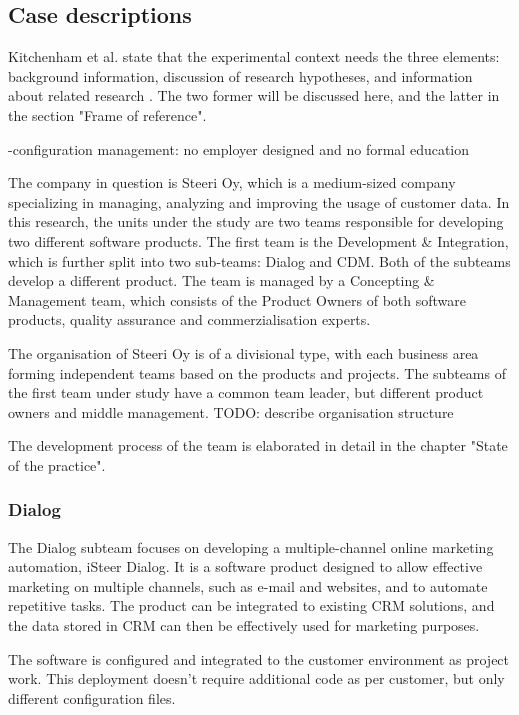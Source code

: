 \documentclass[english]{tktltiki2}
\theoremstyle{definition}
\theoremstyle{remark}
\begin{document}
\subsection{Case descriptions} %
Kitchenham et al. state that the experimental context needs the three elements: background information, discussion of research hypotheses, and information about related research \cite{kitchenham2002preliminary}. The two former will be discussed here, and the latter in the section "Frame of reference".

-configuration management: no employer designed and no formal education

The company in question is Steeri Oy, which is a medium-sized company specializing in managing, analyzing and improving the usage of customer data. In this research, the units under the study are two teams responsible for developing two different software products. The first team is the Development & Integration, which is further split into two sub-teams: Dialog and CDM. Both of the subteams develop a different product. The team is managed by a Concepting & Management team, which consists of the Product Owners of both software products, quality assurance and commerzialisation experts. 

The organisation of Steeri Oy is of a divisional type, with each business area forming independent teams based on the products and projects. The subteams of the first team under study have a common team leader, but different product owners and middle management. TODO: describe organisation structure %

The development process of the team is elaborated in detail in the chapter "State of the practice". 

\subsubsection{Dialog}
The Dialog subteam focuses on developing a multiple-channel online marketing automation, iSteer Dialog. It is a software product designed to allow effective marketing on multiple channels, such as e-mail and websites, and to automate repetitive tasks. The product can be integrated to existing CRM solutions, and the data stored in CRM can then be effectively used for marketing purposes. 

The software is configured and integrated to the customer environment as project work. This deployment doesn't require additional code as per customer, but only different configuration files. 
\end{document}
